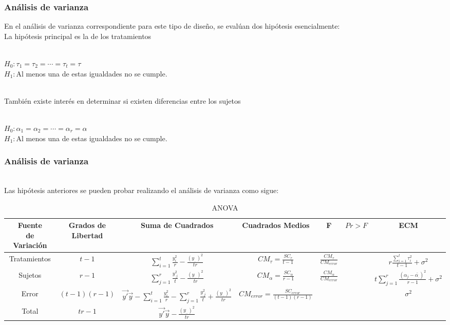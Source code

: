 \documentclass[12pt]{beamer}
\begin{document}
\begin{frame}
\frametitle{Análisis de varianza}
En el análisis de varianza correspondiente para este tipo de diseño, se evalúan dos hipótesis esencialmente:
~\\La hipótesis principal es la de los tratamientos
\begin{center}
~\\$H_0:\tau_1=\tau_2=\cdots=\tau_t=\tau$
~\\$H_1:$Al menos una de estas igualdades no se cumple.
\end{center}
~\\También existe interés en determinar si existen diferencias entre los sujetos
\begin{center}
~\\$H_0:\alpha_1=\alpha_2=\cdots=\alpha_r=\alpha$ 
~\\$H_1:$Al menos una de estas igualdades no se cumple.
\end{center}
\end{frame}

\begin{frame}
\frametitle{Análisis de varianza}
~\\Las hipótesis anteriores se pueden probar realizando el análisis de varianza como sigue:

\begin{table}[htbp]
  \centering
\resizebox{12cm}{!} {
\begin{tabular}{|c|c|c|c|c|c|c|}
\hline 
\parbox{7em}{\centering Fuente\\ de Variación} & \parbox{7em}{\centering Grados de\\ Libertad} & Suma de Cuadrados & Cuadrados Medios & F & $Pr>F$ & ECM \\ 
\hline 
Tratamientos & $t-1$ & $\sum\limits_{i=1}^{t}\frac{y^2_{i.}}{r}-\frac{(y_{..})^2}{tr}$ & $CM_\tau=\frac{SC_\tau}{t-1}$ & $\frac{CM_{\tau}}{CM_{error}}$ &  & $r\frac{\sum\limits_{i=1}^{t}\tau_i^2}{t-1}+\sigma^2$\\ 
Sujetos & $r-1$ & $\sum\limits_{j=1}^{r}\frac{y^2_{.j}}{t}-\frac{(y_{..})^2}{tr}$ & $CM_\alpha=\frac{SC_\alpha}{r-1}$ & $\frac{CM_{\alpha}}{CM_{error}}$ & &$t\sum\limits_{j=1}^{r}\frac{(\alpha_{j}-\bar{\alpha_{.}})^2}{r-1}+\sigma^2$\\
Error & $(t-1)(r-1)$ & $\vec{y'}\vec{y}-\sum\limits_{i=1}^{t}\frac{y^2_{i.}}{r}-\sum\limits_{j=1}^{r}\frac{y^2_{.j}}{t}+\frac{(y_{..})^2}{tr}$ & $CM_{error}=\frac{SC_{error}}{(t-1)(r-1)}$ &   & & $\sigma^2$\\ 
Total & $tr-1$ & $\vec{y'}\vec{y}-\frac{(y_{..})^2}{tr}$ &  &   & &\\ 
\hline 
\end{tabular} 
}
\caption{ANOVA}
\label{tab:addlabel}%
\end{table}%
\end{frame}
\end{document}

